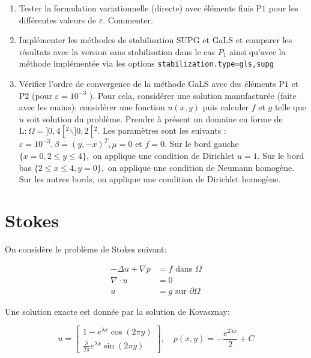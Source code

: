 \documentclass[11pt,utf8]{article}
\begin{document}
\begin{enumerate}
  \item Tester la formulation variationnelle (directe) avec éléments finis $\mathrm{P} 1$ pour les différentes valeurs de $\varepsilon$. Commenter.
  \item Implémenter les méthodes de stabilisation SUPG et GaLS et comparer les résultats avec la version sans stabilisation dans le cas $P_1$  ainsi qu'avec la méthode implémentée via les options \texttt{stabilization.type=gls,supg}
  \item Vérifier l'ordre de convergence de la méthode GaLS avec des éléments $\mathrm{P} 1$ et $\mathrm{P} 2$ (pour $\varepsilon=10^{-3}$ ). 
  Pour cela, considérer une solution manufacturée (faite avec les mains): considérer une fonction $u(x, y)$ puis calculer $f$ et $g$ telle que $u$ soit solution du problème. 
  Prendre à présent un domaine en forme de $\mathrm{L}: \Omega=] 0,4\left[^2 \backslash ] 0,2\left[ ^2.\right.\right.$ 
  Les paramètres sont les suivants : $\varepsilon=10^{-3}, \beta=(y,-x)^{T}, \mu=0$ et $f=0 .$ 
  Sur le bord gauche $\{x=0,2 \leqslant y \leqslant 4\},$ on applique une condition de Dirichlet $u=1$. 
  Sur le bord bas $\{2 \leqslant x \leqslant 4, y=0\},$ on applique une condition de Neumann homogène. 
  Sur les autres bords, on applique une condition de Dirichlet homogène.
\end{enumerate}

\section[]{Stokes}

On considère le problème de Stokes suivant:

$$\begin{aligned} -\Delta u+\nabla p &=f \text{ dans } \Omega \\ \nabla \cdot u &=0 \\ u&=g \text{ sur } \partial \Omega \end{aligned}$$

Une solution exacte est donnée par la solution de Kovasznay:

$$u=\left[\begin{array}{c} 1-e^{\lambda x} \cos (2 \pi y) \\ \frac{\lambda}{2 \pi} e^{\lambda x} \sin (2 \pi y) \end{array}\right], \quad p(x, y)=-\frac{e^{2 \lambda x}}{2}+C$$
\end{document}
